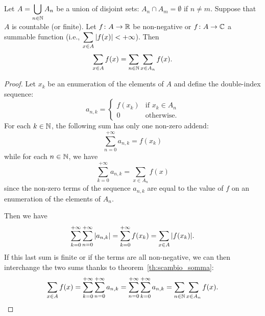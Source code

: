 \begin{theorem}
    Let $A = \displaystyle\bigcup_{n\in {\mathbb N}} A_n$ be a union of disjoint sets:
  $A_n\cap A_m=\emptyset$ if $n\neq m$.
  Suppose that $A$ is countable (or finite).
  Let $f\colon A \to {\mathbb R}$ be non-negative or $f\colon A \to {\mathbb C}$ 
  a summable function (i.e., $\displaystyle\sum_{x\in A}{\left|f(x)\right|}< +\infty$).
  Then 
  \[
    \sum_{x\in A}f(x) = \sum_{n\in {\mathbb N}} \sum_{x\in A_n} f(x).  
  \]
\end{theorem}
%
\begin{proof}
Let $x_k$ be an enumeration of the elements of $A$ and define 
the double-index sequence:
\[
  a_{n,k} = \begin{cases}
    f(x_k) & \text{if $x_k\in A_n$}\\
    0 & \text{otherwise.}
  \end{cases}  
\]
For each $k\in {\mathbb N}$, the following sum 
has only one non-zero addend:
\[
 \sum_{n=0}^{+\infty}  a_{n,k} = f(x_k)
\]
while for each $n\in {\mathbb N}$, we have 
\[
 \sum_{k=0}^{+\infty} a_{n,k} = \sum_{x\in A_n} f(x)  
\]
since the non-zero terms of the sequence 
$a_{n,k}$ are equal to the value of $f$ on an enumeration 
of the elements of $A_n$.

Then we have
\[
 \sum_{k=0}^{+\infty}\sum_{n=0}^{+\infty} {\left|a_{n,k}\right|}
 = \sum_{k=0}^{+\infty} {f(x_k)} = \sum_{x\in A} {\left|f(x_k)\right|}.
\]
If this last sum is finite or if the terms are all non-negative,
we can then interchange the two sums thanks to theorem~\ref{th:scambio_somma}:
\[
  \sum_{x\in A} f(x) 
  = \sum_{k=0}^{+\infty} \sum_{n=0}^{+\infty} a_{n,k}
  = \sum_{n=0}^{+\infty} \sum_{k=0}^{+\infty} a_{n,k}
  = \sum_{n\in {\mathbb N}} \sum_{x\in A_n}f(x).  
\]
\end{proof}

